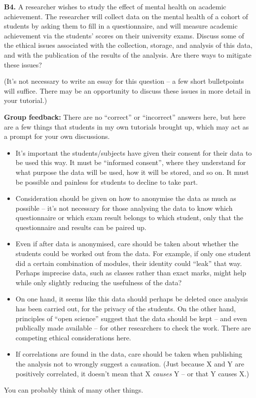 \documentclass[
  a4paper,
]{book}
\providecommand{\tightlist}{%
  \setlength{\itemsep}{0pt}\setlength{\parskip}{0pt}}
\theoremstyle{definition}
\theoremstyle{definition}
\theoremstyle{definition}
\theoremstyle{definition}
\theoremstyle{remark}
\begin{document}
\textbf{B4.} A researcher wishes to study the effect of mental health on academic achievement. The researcher will collect data on the mental health of a cohort of students by asking them to fill in a questionnaire, and will measure academic achievement via the students' scores on their university exams. Discuss some of the ethical issues associated with the collection, storage, and analysis of this data, and with the publication of the results of the analysis. Are there ways to mitigate these issues?

(It's not necessary to write an essay for this question -- a few short bulletpoints will suffice. There may be an opportunity to discuss these issues in more detail in your tutorial.)

\begin{myanswers}
\textbf{Group feedback:} There are no ``correct'' or ``incorrect'' answers here, but here are a few things that students in my own tutorials brought up, which may act as a prompt for your own discussions.

\begin{itemize}
\tightlist
\item
  It's important the students/subjects have given their consent for their data to be used this way. It must be ``informed consent'', where they understand for what purpose the data will be used, how it will be stored, and so on. It must be possible and painless for students to decline to take part.
\item
  Consideration should be given on how to anonymise the data as much as possible -- it's not necessary for those analysing the data to know which questionnaire or which exam result belongs to which student, only that the questionnaire and results can be paired up.
\item
  Even if after data is anonymised, care should be taken about whether the students could be worked out from the data. For example, if only one student did a certain combination of modules, their identity could ``leak'' that way. Perhaps imprecise data, such as classes rather than exact marks, might help while only slightly reducing the usefulness of the data?
\item
  On one hand, it seems like this data should perhaps be deleted once analysis has been carried out, for the privacy of the students. On the other hand, principles of ``open science'' suggest that the data should be kept -- and even publically made available -- for other researchers to check the work. There are competing ethical considerations here.
\item
  If correlations are found in the data, care should be taken when publishing the analysis not to wrongly suggest a causation. (Just because X and Y are positively correlated, it doesn't mean that X \emph{causes} Y -- or that Y causes X.)
\end{itemize}

You can probably think of many other things.

\end{myanswers}
\end{document}
